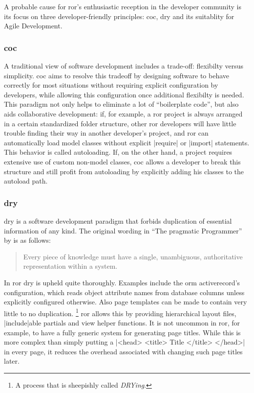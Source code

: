 A probable cause for \gls{ror}'s enthusiastic reception in the developer community is its focus on three developer-friendly principles: \acrfull{coc}, \gls{dry} and its suitablity for Agile Development.\citep{agilewebdev}

\subsubsection{\acrlong{coc}}

A traditional view of software development includes a trade-off: flexibilty versus simplicity. \acrshort{coc} aims to resolve this tradeoff by designing software to behave correctly for most situations without requiring explicit configuration by developers, while allowing this configuration once additional flexibilty is needed. This paradigm not only helps to eliminate a lot of ``boilerplate code'', but also aids collaborative development: if, for example, a \gls{ror} project is always arranged in a certain standardized folder structure, other \gls{ror} developers will have little trouble finding their way in another developer's project, and \gls{ror} can automatically load model classes without explicit |require| or |import| statements. This behavior is called autoloading. If, on the other hand, a project requires extensive use of custom non-model classes, \acrshort{coc} allows a developer to break this structure and still profit from autoloading by explicitly adding his classes to the autoload path.\citep{railsautoloading}

\subsubsection{\acrlong{dry}}

\acrshort{dry} is a software development paradigm that forbids duplication of essential information of any kind. The original wording in ``The pragmatic Programmer'' by \citet{Hunt:2000:PPJ:320326} is as follows:

\begin{quote}
  
Every piece of knowledge must have a single, unambiguous, authoritative representation within a system.
  
\end{quote}

In \gls{ror} \acrlong{dry} is upheld quite thoroughly. Examples include the \acrfull{orm} \gls{activerecord}'s configuration, which reads object attribute names from database columns unless explicitly configured otherwise. Also page templates can be made to contain very little to no duplication. \footnote{A process that is sheepishly called \emph{DRYing}.} \gls{ror} allows this by providing hierarchical layout files, |include|able partials and view helper functions. It is not uncommon in \gls{ror}, for example, to have a fully generic system for generating page titles. While this is more complex than simply putting a |<head> <title> Title </title> </head>| in every page, it reduces the overhead associated with changing such page titles later.

